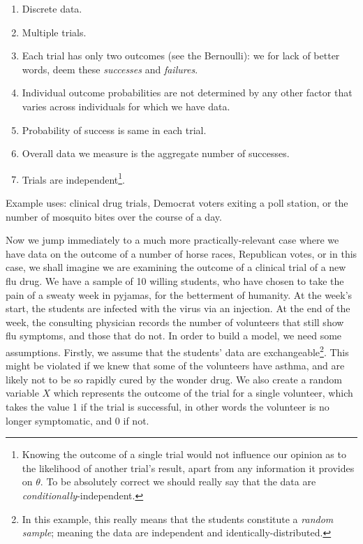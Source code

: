 \documentclass[11pt,fullpage]{book}
\begin{document}
\begin{enumerate} 
\item Discrete data.
\item Multiple trials.
\item Each trial has only two outcomes (see the Bernoulli): we for lack of better words, deem these \textit{successes} and \textit{failures}.
\item Individual outcome probabilities are not determined by any other factor that varies across individuals for which we have data.
\item Probability of success is same in each trial.
\item Overall data we measure is the aggregate number of successes. 
\item Trials are independent\footnote{Knowing the outcome of a single trial would not influence our opinion as to the likelihood of another trial's result, apart from any information it provides on $\theta$. To be absolutely correct we should really say that the data are \textit{conditionally}-independent.}.
\end{enumerate}

Example uses: clinical drug trials, Democrat voters exiting a poll station, or the number of mosquito bites over the course of a day.

Now we jump immediately to a much more practically-relevant case where we have data on the outcome of a number of horse races, Republican votes, or in this case, we shall imagine we are examining the outcome of a clinical trial of a new flu drug. We have a sample of 10 willing students, who have chosen to take the pain of a sweaty week in pyjamas, for the betterment of humanity. At the week's start, the students are infected with the virus via an injection. At the end of the week, the consulting physician records the number of volunteers that still show flu symptoms, and those that do not. In order to build a model, we need some assumptions. Firstly, we assume that the students' data are exchangeable\footnote{In this example, this really means that the students constitute a \textit{random sample}; meaning the data are independent and identically-distributed.}. This might be violated if we knew that some of the volunteers have asthma, and are likely not to be so rapidly cured by the wonder drug. We also create a random variable $X$ which represents the outcome of the trial for a single volunteer, which takes the value 1 if the trial is successful, in other words the volunteer is no longer symptomatic, and 0 if not.
\end{document}
